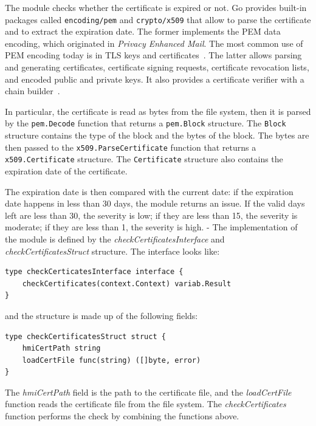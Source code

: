 The module checks whether the certificate is expired or not. Go provides built-in packages called \texttt{encoding/pem} and \texttt{crypto/x509} that allow to parse the certificate and to extract the expiration date. The former implements the PEM data encoding, which originated in \textit{Privacy Enhanced Mail}. The most common use of PEM encoding today is in TLS keys and certificates~\cite{go-package-pem}. The latter allows parsing and generating certificates, certificate signing requests, certificate revocation lists, and encoded public and private keys. It also provides a certificate verifier with a chain builder~\cite{go-package-x509}.

In particular, the certificate is read as bytes from the file system, then it is parsed by the \texttt{pem.Decode} function that returns a \texttt{pem.Block} structure. The \texttt{Block} structure contains the type of the block and the bytes of the block. The bytes are then passed to the \texttt{x509.ParseCertificate} function that returns a \texttt{x509.Certificate} structure. The \texttt{Certificate} structure also contains the expiration date of the certificate.

The expiration date is then compared with the current date: if the expiration date happens in less than 30 days, the module returns an issue. If the valid days left are less than 30, the severity is low; if they are less than 15, the severity is moderate; if they are less than 1, the severity is high.
-
The implementation of the module is defined by the \textit{checkCertificatesInterface} and \textit{checkCertificatesStruct} structure. The interface looks like:

\begin{lstlisting}[style=golang]
type checkCerticatesInterface interface {
	checkCertificates(context.Context) variab.Result
}
\end{lstlisting}

and the structure is made up of the following fields:

\begin{lstlisting}[style=golang]
type checkCertificatesStruct struct {
	hmiCertPath string
	loadCertFile func(string) ([]byte, error)
}
\end{lstlisting}

The \textit{hmiCertPath} field is the path to the certificate file, and the \textit{loadCertFile} function reads the certificate file from the file system. The \textit{checkCertificates} function performs the check by combining the functions above.

